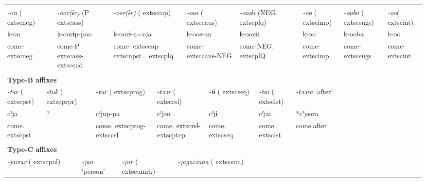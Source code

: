 \tabletail{}
\tablelasttail{}
\begin{tabularx}{\textwidth}{XXXXXXXXXXXXXXXXXXXXX}
\lsptoprule
\multicolumn{21}{X}{{\bfseries Type-A affixes}}\\
\multicolumn{2}{X}{{ \textit{{}-on} (	extsc{neg})}} & \multicolumn{5}{X}{{ \textit{{}-oor(ɨr)} (P	extsc{ass})}} & \multicolumn{5}{X}{{ \textit{{}-oor(ɨr)} (	extsc{cap})}} & \multicolumn{3}{X}{{ \textit{{}-oos} (	extsc{caus})}} & \multicolumn{3}{X}{{ \textit{{}-oozɨi} (NEG.	extsc{plq})}} & { \textit{{}-oo} (	extsc{imp})} & { \textit{{}-ooba} (	extsc{sugs})} & { \textit{{}-oo}(	extsc{int})}\\
\multicolumn{2}{X}{{ k-on}} & \multicolumn{5}{X}{{ k-oorɨp-poo}} & \multicolumn{5}{X}{{ k-oorɨ-n=nja}} & \multicolumn{3}{X}{{ k-oos-an}} & \multicolumn{3}{X}{{ k-oozɨi}} & { k-oo} & { k-ooba} & { k-oo}\\
\multicolumn{2}{X}{come-	extsc{neg}} & \multicolumn{5}{X}{come-P	extsc{ass}-	extsc{cnd}} & \multicolumn{5}{X}{come-	extsc{cap}-	extsc{npst}=	extsc{plq}} & \multicolumn{3}{X}{come-	extsc{caus}-NEG} & \multicolumn{3}{X}{come-NEG.	extsc{pl}Q} & come-	extsc{imp} & come-	extsc{sugs} & come-	extsc{int}\\
\multicolumn{21}{X}{}\\
\multicolumn{21}{X}{{\bfseries Type-B affixes}}\\
{ \textit{{}-tar} (	extsc{pst})} & \multicolumn{4}{X}{{ \textit{{}-tuk} (	extsc{prpr})}} & \multicolumn{5}{X}{{ \textit{{}-tur} (	extsc{prog})}} & \multicolumn{4}{X}{{ \textit{{}-təər} (	extsc{rsl})}} & \multicolumn{2}{X}{{ \textit{{}-tɨ} (	extsc{seq})}} & { \textit{{}-tai} (	extsc{lst})} & \multicolumn{4}{X}{{ \textit{{}-təəra} ‘after’}}\\
{ cˀja} & \multicolumn{4}{X}{{ ?}} & \multicolumn{5}{X}{{ cˀjup-pa}} & \multicolumn{4}{X}{{ cˀjən}} & \multicolumn{2}{X}{{ cˀjɨ}} & { cˀjai} & \multicolumn{4}{X}{{ *cˀjəəra}}\\
come.	extsc{pst} & \multicolumn{4}{X}{} & \multicolumn{5}{X}{come.	extsc{prog}-	extsc{csl}} & \multicolumn{4}{X}{come.	extsc{rsl}-	extsc{ptcp}} & \multicolumn{2}{X}{come.	extsc{seq}} & come.	extsc{lst} & \multicolumn{4}{X}{{ come.after}}\\
& \multicolumn{4}{X}{} & \multicolumn{5}{X}{} & \multicolumn{4}{X}{} & \multicolumn{2}{X}{} &  & \multicolumn{4}{X}{}\\
\multicolumn{21}{X}{{\bfseries Type-C affixes}}\\
\multicolumn{4}{X}{{ \textit{{}-jawur} (	extsc{pol})}} & \multicolumn{4}{X}{{ \textit{{}-jaa} ‘person’}} & \multicolumn{3}{X}{{ \textit{{}-jur} (	extsc{umrk})}} & \multicolumn{10}{X}{{ \textit{{}-jagacinaa} (	extsc{sim})}}\\

\end{tabularx}
